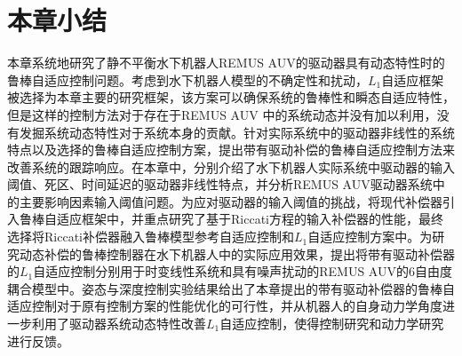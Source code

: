 


\section{本章小结 }

本章系统地研究了静不平衡水下机器人REMUS AUV的驱动器具有动态特性时的鲁棒自适应控制问题。考虑到水下机器人模型的不确定性和扰动，$L_1$自适应框架被选择为本章主要的研究框架，该方案可以确保系统的鲁棒性和瞬态自适应特性，但是这样的控制方法对于存在于REMUS AUV 中的系统动态并没有加以利用，没有发掘系统动态特性对于系统本身的贡献。针对实际系统中的驱动器非线性的系统特点以及选择的鲁棒自适应控制方案，提出带有驱动补偿的鲁棒自适应控制方法来改善系统的跟踪响应。在本章中，分别介绍了水下机器人实际系统中驱动器的输入阈值、死区、时间延迟的驱动器非线性特点，并分析REMUS AUV驱动器系统中的主要影响因素输入阈值问题。为应对驱动器的输入阈值的挑战，将现代补偿器引入鲁棒自适应框架中，并重点研究了基于Riccati方程的输入补偿器的性能，最终选择将Riccati补偿器融入鲁棒模型参考自适应控制和$L_1$自适应控制方案中。为研究动态补偿的鲁棒控制器在水下机器人中的实际应用效果，提出将带有驱动补偿器的$L_{1}$自适应控制分别用于时变线性系统和具有噪声扰动的REMUS AUV的6自由度耦合模型中。姿态与深度控制实验结果给出了本章提出的带有驱动补偿器的鲁棒自适应控制对于原有控制方案的性能优化的可行性，并从机器人的自身动力学角度进一步利用了驱动器系统动态特性改善$L_1$自适应控制，使得控制研究和动力学研究进行反馈。
